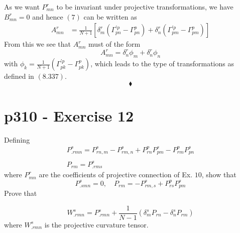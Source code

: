 As we want $P^r_{mn}$ to be invariant under projective transformations, we have $B^r_{mn}=0$ and hence $(7)$ can be written as
\begin{align}
A^r_{mn}&=\frac{1}{N+1}\left[\delta^r_m\left( \Gamma^{'p}_{pn}-\Gamma^p_{pn}\right) +  \delta^r_n \left(\Gamma^{'p}_{pm} -   \Gamma^p_{pm} \right)\right]
\end{align}
From this we see that $A^r_{mn}$ must of the form
$$A^r_{mn}=\delta^r_n\phi_m+\delta^r_n\phi_n$$
with $\phi_k = \frac{1}{N+1}\left( \Gamma^{'p}_{pk}-\Gamma^p_{pk}\right) $, which leads to the type of transformations as defined in $\mathbf{(8.337)}$.
$$\blacklozenge$$
\newpage


\section{p310 - Exercise 12}
\begin{tcolorbox}
Defining  $$\begin{matrix}
P^s_{.rmn}=P^s_{rn,m}-P^s_{rm,n}+P^p_{rn}P^s_{pm}-P^p_{rm}P^s_{pn} \\\\
P_{rm}=P^s_{.rms}
\end{matrix}$$
where  $P^r_{mn}$ are the coefficients of projective connection of Ex. $10$, show that
$$P^s_{.smn}=0,\quad P_{rm}=-P^s_{rm,s}+P^p_{rs}P^s_{pm}  $$
Prove that 

$$W^s_{.rmn}=P^s_{.rmn}+\frac{1}{N-1}\left(\delta^s_m P_{rn}-\delta^s_nP_{rm}\right) $$
where $W^s_{.rmn}$ is the projective curvature tensor.
\end{tcolorbox}

